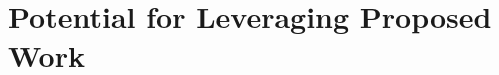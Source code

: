 \documentclass[12pt]{article}
\begin{document}
\section{Potential for Leveraging Proposed Work}
\label{sec:potential}


% 



 


\end{document}
